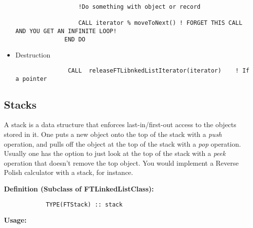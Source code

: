 \documentclass[9pt]{article}
\begin{document}
\begin{itemize}
{\begin{verbatim}
                  !Do something with object or record

                  CALL iterator % moveToNext() ! FORGET THIS CALL AND YOU GET AN INFINITE LOOP!
              END DO
\end{verbatim}}

         \item Destruction

{\color{blue}\begin{verbatim}
               CALL  releaseFTLibnkedListIterator(iterator)    ! If a pointer
\end{verbatim}}
\end{itemize}

\subsection{Stacks}
A stack is a data structure that enforces last-in/first-out access to the objects stored in it. One puts
a new object onto the top of the stack with a \emph{push} operation, and pulls off the object at the
top of the stack with a \emph{pop} operation. Usually one has the option to just look at the top of 
the stack with a \emph{peek} operation that doesn't remove the top object. You would implement a 
Reverse Polish calculator with a stack, for instance.

     {\bf Definition (Subclass of FTLinkedListClass):}
	{\color{blue}\begin{verbatim}
        	TYPE(FTStack) :: stack
	\end{verbatim}}
     {\bf Usage:}
\end{document}

